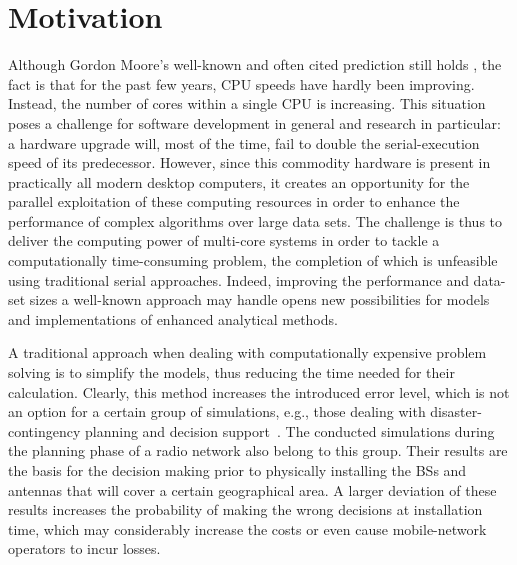 \clearpage{}


\section{Motivation}

Although Gordon Moore's well-known and often cited prediction still
holds \cite{Moore_Cramming_more_components_onto_integrated_circuits:1998},
the fact is that for the past few years, CPU speeds have hardly been
improving. Instead, the number of cores within a single CPU is increasing.
This situation poses a challenge for software development in general
and research in particular: a hardware upgrade will, most of the time,
fail to double the serial-execution speed of its predecessor. However,
since this commodity hardware is present in practically all modern
desktop computers, it creates an opportunity for the parallel exploitation
of these computing resources in order to enhance the performance of
complex algorithms over large data sets. The challenge is thus to
deliver the computing power of multi-core systems in order to tackle
a computationally time-consuming problem, the completion of which
is unfeasible using traditional serial approaches. Indeed, improving
the performance and data-set sizes a well-known approach may handle
opens new possibilities for models and implementations of enhanced
analytical methods.

A traditional approach when dealing with computationally expensive
problem solving is to simplify the models, thus reducing the time
needed for their calculation. Clearly, this method increases the introduced
error level, which is not an option for a certain group of simulations,
e.g., those dealing with disaster-contingency planning and decision
support~\cite{Huang_Using_adaptively_coupled_models_and_high_performance_computing_for_enabling_the_computability_of_dust_storm_forecasting:2012,Yin_A_framework_for_integrating_GIS_and_parallel_computing_for_spatial_control_problems_a_case_study_of_wildfire_dontrol:2012}.
The conducted simulations during the planning phase of a radio network
also belong to this group. Their results are the basis for the decision
making prior to physically installing the BSs and antennas that will
cover a certain geographical area. A larger deviation of these results
increases the probability of making the wrong decisions at installation
time, which may considerably increase the costs or even cause mobile-network
operators to incur losses.

